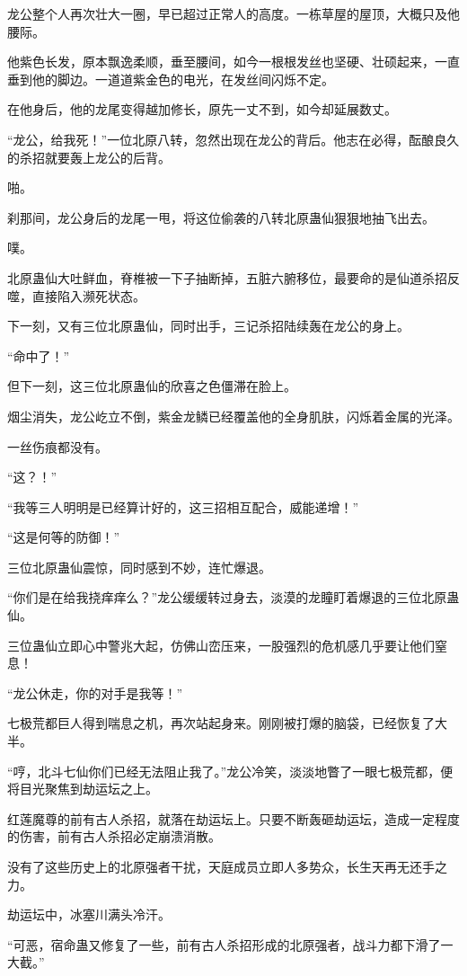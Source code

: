 \begin{this_body}
龙公整个人再次壮大一圈，早已超过正常人的高度。一栋草屋的屋顶，大概只及他腰际。

他紫色长发，原本飘逸柔顺，垂至腰间，如今一根根发丝也坚硬、壮硕起来，一直垂到他的脚边。一道道紫金色的电光，在发丝间闪烁不定。

在他身后，他的龙尾变得越加修长，原先一丈不到，如今却延展数丈。

“龙公，给我死！”一位北原八转，忽然出现在龙公的背后。他志在必得，酝酿良久的杀招就要轰上龙公的后背。

啪。

刹那间，龙公身后的龙尾一甩，将这位偷袭的八转北原蛊仙狠狠地抽飞出去。

噗。

北原蛊仙大吐鲜血，脊椎被一下子抽断掉，五脏六腑移位，最要命的是仙道杀招反噬，直接陷入濒死状态。

下一刻，又有三位北原蛊仙，同时出手，三记杀招陆续轰在龙公的身上。

“命中了！”

但下一刻，这三位北原蛊仙的欣喜之色僵滞在脸上。

烟尘消失，龙公屹立不倒，紫金龙鳞已经覆盖他的全身肌肤，闪烁着金属的光泽。

一丝伤痕都没有。

“这？！”

“我等三人明明是已经算计好的，这三招相互配合，威能递增！”

“这是何等的防御！”

三位北原蛊仙震惊，同时感到不妙，连忙爆退。

“你们是在给我挠痒痒么？”龙公缓缓转过身去，淡漠的龙瞳盯着爆退的三位北原蛊仙。

三位蛊仙立即心中警兆大起，仿佛山峦压来，一股强烈的危机感几乎要让他们窒息！

“龙公休走，你的对手是我等！”

七极荒都巨人得到喘息之机，再次站起身来。刚刚被打爆的脑袋，已经恢复了大半。

“哼，北斗七仙你们已经无法阻止我了。”龙公冷笑，淡淡地瞥了一眼七极荒都，便将目光聚焦到劫运坛之上。

红莲魔尊的前有古人杀招，就落在劫运坛上。只要不断轰砸劫运坛，造成一定程度的伤害，前有古人杀招必定崩溃消散。

没有了这些历史上的北原强者干扰，天庭成员立即人多势众，长生天再无还手之力。

劫运坛中，冰塞川满头冷汗。

“可恶，宿命蛊又修复了一些，前有古人杀招形成的北原强者，战斗力都下滑了一大截。”


\end{this_body}
